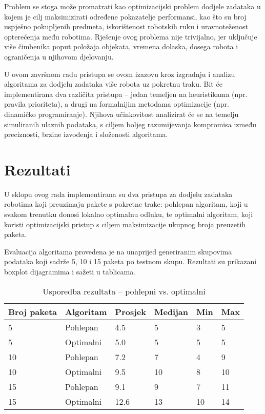 \documentclass{fer}
\begin{document}
Problem se stoga može promatrati kao optimizacijski problem dodjele zadataka u kojem je cilj maksimizirati određene pokazatelje performansi, kao što su broj uspješno pokupljenih predmeta, iskorištenost robotskih ruku i uravnoteženost opterećenja među robotima. Rješenje ovog problema nije trivijalno, jer uključuje više čimbenika poput položaja objekata, vremena dolaska, dosega robota i ograničenja u njihovom djelovanju.

U ovom završnom radu pristupa se ovom izazovu kroz izgradnju i analizu algoritama za dodjelu zadataka više robota uz pokretnu traku. Bit će implementirana dva različita pristupa – jedan temeljen na heuristikama (npr. pravila prioriteta), a drugi na formalnijim metodama optimizacije (npr. dinamičko programiranje). Njihova učinkovitost analizirat će se na temelju simuliranih ulaznih podataka, s ciljem boljeg razumijevanja kompromisa između preciznosti, brzine izvođenja i složenosti algoritama.

\chapter{Rezultati}

U sklopu ovog rada implementirana su dva pristupa za dodjelu zadataka robotima koji preuzimaju pakete s pokretne trake: pohlepan algoritam, koji u svakom trenutku donosi lokalno optimalnu odluku, te optimalni algoritam, koji koristi optimizacijski pristup s ciljem maksimizacije ukupnog broja preuzetih paketa.

Evaluacija algoritama provedena je na unaprijed generiranim skupovima podataka koji sadrže 5, 10 i 15 paketa po testnom skupu. Rezultati su prikazani boxplot dijagramima i sažeti u tablicama.

\begin{table}[h]
\centering
\caption{Usporedba rezultata – pohlepni vs. optimalni}
\begin{tabular}{@{}llllll@{}}
\toprule
Broj paketa & Algoritam & Prosjek & Medijan & Min & Max \\
\midrule
5 & Pohlepan & 4.5 & 5 & 3 & 5 \\
5 & Optimalni & 5.0 & 5 & 5 & 5 \\
10 & Pohlepan & 7.2 & 7 & 4 & 9 \\
10 & Optimalni & 9.5 & 10 & 8 & 10 \\
15 & Pohlepan & 9.1 & 9 & 7 & 11 \\
15 & Optimalni & 12.6 & 13 & 10 & 14 \\
\bottomrule
\end{tabular}
\end{table}
\end{document}
